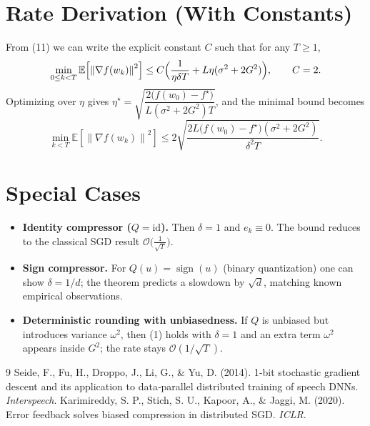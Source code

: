 \documentclass{article}
\newcommand{\E}{\mathbb{E}}
\newcommand{\norm}[1]{\left\|#1\right\|}
\begin{document}
\section*{Rate Derivation (With Constants)}
From (11) we can write the explicit constant $C$ such that for any $T\ge1$,
\[
\min_{0\le k<T}\E\!\left[\norm{\nabla f(w_k)}^2\right]
\le
C\Bigl(\frac{1}{\eta\delta T}+L\eta(\sigma^2+2G^2)\Bigr),
\qquad
C=2.
\]
Optimizing over $\eta$ gives $\eta^\star = \sqrt{\dfrac{2\bigl(f(w_0)-f^\star\bigr)}{L(\sigma^2+2G^2)T}}$, and the minimal bound becomes
\[
\min_{k<T}\E\!\left[\norm{\nabla f(w_k)}^2\right]
\le
2\sqrt{\frac{2L\bigl(f(w_0)-f^\star\bigr)(\sigma^2+2G^2)}{\delta^2 T}} .
\]

\section*{Special Cases}
\begin{itemize}
\item \textbf{Identity compressor ($Q=\mathrm{id}$).} Then $\delta=1$ and $e_k\equiv0$. The bound reduces to the classical SGD result $\mathcal{O}\bigl(\frac{1}{\sqrt{T}}\bigr)$.
\item \textbf{Sign compressor.} For $Q(u)=\operatorname{sign}(u)$ (binary quantization) one can show $\delta=1/d$; the theorem predicts a slowdown by $\sqrt{d}$, matching known empirical observations.
\item \textbf{Deterministic rounding with unbiasedness.} If $Q$ is unbiased but introduces variance $\omega^2$, then (1) holds with $\delta=1$ and an extra term $\omega^2$ appears inside $G^2$; the rate stays $\mathcal{O}(1/\sqrt{T})$.
\end{itemize}

\begin{thebibliography}{9}
 Seide, F., Fu, H., Droppo, J., Li, G., \& Yu, D. (2014). 1‑bit stochastic gradient descent and its application to data‑parallel distributed training of speech DNNs. \emph{Interspeech}.
 Karimireddy, S. P., Stich, S. U., Kapoor, A., \& Jaggi, M. (2020). Error feedback solves biased compression in distributed SGD. \emph{ICLR}.
\end{thebibliography}
\end{document}
